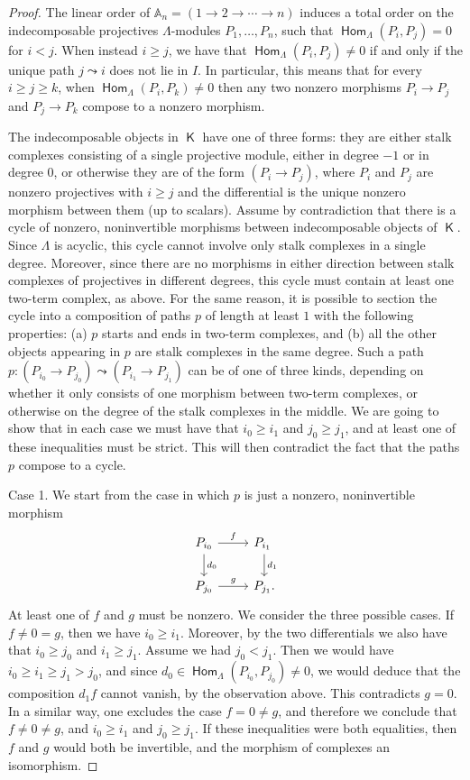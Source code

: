 \documentclass[a4paper,11pt]{amsart}
\theoremstyle{plain}
\theoremstyle{definition}
\newcommand{\Abb}{\mathbb{A}} \renewcommand{\Bbb}{\mathbb{B}} \newcommand{\Cbb}{\mathbb{C}}
\DeclareMathOperator{\Hom}{\mathsf{Hom}}
\DeclareMathOperator{\K}{\mathsf{K}}
\begin{document}
\begin{proof}
	The linear order of $\Abb_n=(1\to
	2\to \cdots \to n)$
	induces a total order on the indecomposable projectives $\Lambda$-modules
	$P_1, \dots, P_n$, such that $\Hom_\Lambda(P_i,P_j)=0$ for $i<j$. When instead
	$i\geq j$, we have that $\Hom_\Lambda(P_i,P_j)\neq 0$ if and only if the
	unique path $j\leadsto i$ does not lie in $I$. In particular, this means that
	for every $i\geq j\geq k$, when $\Hom_\Lambda(P_i,P_k)\neq 0$ then any two
	nonzero morphisms $P_i\to P_j$ and $P_j\to P_k$ compose to a nonzero morphism.

	The indecomposable objects in $\K$ have one of three forms: they are either
	stalk complexes consisting of a single projective module, either in degree
	$-1$ or in degree $0$, or otherwise they are of the form $(P_i\to P_j)$,
	where $P_i$ and $P_j$ are nonzero projectives with $i\geq j$ and the differential
	is the unique nonzero morphism between them (up to scalars). Assume by
	contradiction that there is a cycle of nonzero, noninvertible morphisms
	between indecomposable objects of $\K$. Since $\Lambda$ is acyclic, this
	cycle cannot involve only stalk complexes in a single degree. Moreover, since
	there are no morphisms in either direction between stalk complexes of
	projectives in different degrees, this cycle must contain at least one
	two-term complex, as above. For the same reason, it is possible to section the
	cycle into a composition of paths $p$ of length at least $1$ with the following properties: (a) $p$
	starts and ends in two-term complexes, and (b) all the other objects appearing
	in $p$ are stalk complexes in the same degree. Such a path
	$p\colon (P_{i_0}\to P_{j_0})\leadsto (P_{i_1}\to P_{j_1})$ can be of one
	of three kinds, depending on whether it only consists of one morphism between
	two-term complexes, or otherwise on the degree of the stalk complexes in the middle. We
	are going to show that in each case we must have that $i_0\geq i_1$ and
	$j_0\geq j_1$, and at least one of these inequalities must be strict. This
	will then contradict the fact that the paths $p$ compose to a
	cycle.

	Case 1. We start from the case in which $p$ is just a nonzero, noninvertible morphism
	\[\begin{tikzcd}
		P_{i_0} \ar{d}{d_0} \ar{r}{f} & P_{i_1}\phantom{.} \ar{d}{d_1} \\
		P_{j_0} \ar{r}{g} & P_{j_1}.
	\end{tikzcd}\]
	At least one of $f$ and $g$ must be nonzero. We consider the three possible
	cases. If $f\neq 0=g$, then we have $i_0\geq i_1$. Moreover, by the two
	differentials we also have that $i_0\geq j_0$ and $i_1\geq j_1$. Assume we had
	$j_0<j_1$. Then we would have $i_0\geq i_1\geq j_1>j_0$, and since
	$d_0\in\Hom_\Lambda(P_{i_0},P_{j_0})\neq 0$, we would
	deduce that the composition $d_1f$ cannot vanish, by the observation
	above. This contradicts $g=0$. In a similar way, one excludes the case
	$f=0\neq g$, and therefore we conclude that $f\neq 0\neq g$, and $i_0\geq i_1$
	and $j_0\geq j_1$. If these inequalities were both equalities, then $f$ and
	$g$ would both be invertible, and the morphism of complexes an isomorphism.


\end{proof}
\end{document}
